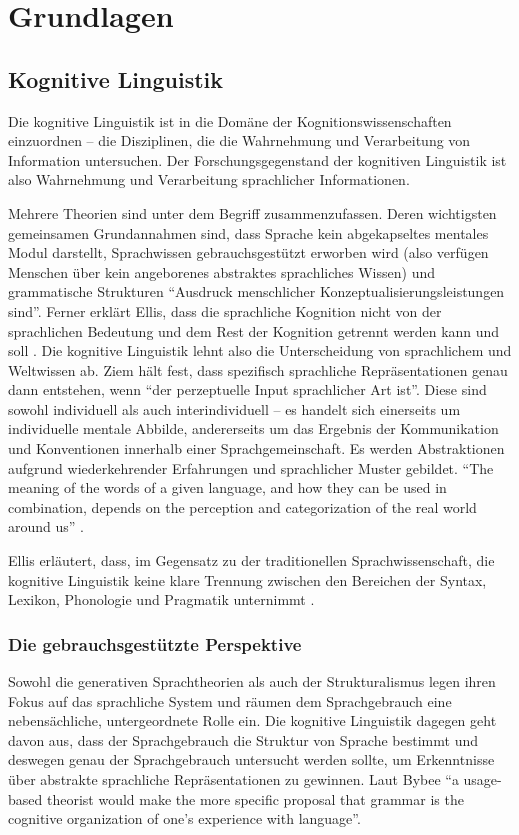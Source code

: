 \section{Grundlagen}

\subsection{Kognitive Linguistik}

Die kognitive Linguistik ist in die Domäne der Kognitionswissenschaften einzuordnen -- die Disziplinen, die die Wahrnehmung und Verarbeitung von Information untersuchen.
Der Forschungsgegenstand der kognitiven Linguistik ist also Wahrnehmung und Verarbeitung sprachlicher Informationen.

Mehrere Theorien sind unter dem Begriff zusammenzufassen.
Deren wichtigsten gemeinsamen Grundannahmen sind, dass Sprache kein abgekapseltes mentales Modul darstellt,
Sprachwissen gebrauchsgestützt erworben wird (also verfügen Menschen über kein angeborenes abstraktes sprachliches Wissen)
und grammatische Strukturen ``Ausdruck menschlicher Konzeptualisierungsleistungen sind''\cite[vgl.][S.10]{Ziem13}.
Ferner erklärt Ellis, dass die sprachliche Kognition nicht von der sprachlichen Bedeutung und dem Rest der Kognition getrennt werden kann und soll \cite[vgl.][S.66]{Ellis08}.
Die kognitive Linguistik lehnt also die Unterscheidung von sprachlichem und Weltwissen ab.
Ziem hält fest, dass spezifisch sprachliche Repräsentationen genau dann entstehen, wenn ``der perzeptuelle Input sprachlicher Art ist''\cite[vgl.][S.37]{Ziem08}.
Diese sind sowohl individuell als auch interindividuell -- es handelt sich einerseits um individuelle mentale Abbilde, andererseits um das Ergebnis der Kommunikation und Konventionen innerhalb einer Sprachgemeinschaft.
Es werden Abstraktionen aufgrund wiederkehrender Erfahrungen und sprachlicher Muster gebildet.
``The meaning of the words of a given language, and how they can be used in combination, depends on the perception and categorization of the real world around us'' \cite[vgl.][S.65]{Ellis08}.

Ellis erläutert, dass, im Gegensatz zu der traditionellen Sprachwissenschaft, die kognitive Linguistik keine klare Trennung zwischen den Bereichen der Syntax, Lexikon, Phonologie und Pragmatik unternimmt \cite[vgl.][S.66]{Ellis08}.

\subsubsection{Die gebrauchsgestützte Perspektive}
Sowohl die generativen Sprachtheorien als auch der Strukturalismus legen ihren Fokus auf das sprachliche System und räumen dem Sprachgebrauch eine nebensächliche, untergeordnete Rolle ein.
Die kognitive Linguistik dagegen geht davon aus, dass der Sprachgebrauch die Struktur von Sprache bestimmt und deswegen genau der Sprachgebrauch untersucht werden sollte, um Erkenntnisse über abstrakte sprachliche Repräsentationen zu gewinnen.
Laut Bybee ``a usage-based theorist would make the more specific proposal that grammar is the cognitive organization of one’s experience with language''\cite[vgl.][S.711]{Bybee06}.

